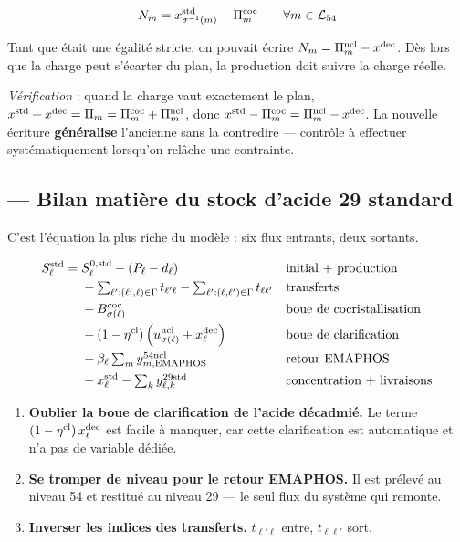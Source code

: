 \begin{equation}
N_m = x^{\mathrm{std}}_{\sigma^{-1}(m)} - \Pi^{\mathrm{coc}}_m \qquad \forall m \in \mathcal{L}_{54}
\label{eq:C6}
\end{equation}

\begin{encadre}[title={Cohérence avec la formulation initiale}]
Tant que  était une égalité stricte, on pouvait écrire $N_m = \Pi^{\mathrm{ncl}}_m - x^{\mathrm{dec}}$. Dès
lors que la charge peut s'écarter du plan, la production doit suivre la charge réelle.

\emph{Vérification} : quand la charge vaut exactement le plan,
$x^{\mathrm{std}} + x^{\mathrm{dec}} = \Pi_m = \Pi^{\mathrm{coc}}_m + \Pi^{\mathrm{ncl}}_m$, donc $x^{\mathrm{std}} - \Pi^{\mathrm{coc}}_m = \Pi^{\mathrm{ncl}}_m - x^{\mathrm{dec}}$.
La nouvelle écriture \textbf{généralise} l'ancienne sans la contredire --- contrôle à
effectuer systématiquement lorsqu'on relâche une contrainte.
\end{encadre}

\subsection{ --- Bilan matière du stock d'acide 29 standard}

C'est l'équation la plus riche du modèle : six flux entrants, deux sortants.

\begin{align}
S^{\mathrm{std}}_\ell = \;& S^{0,\mathrm{std}}_\ell + (P_\ell - d_\ell)
&& \text{initial + production} \notag \\
&+ \textstyle\sum_{\ell' : (\ell',\ell) \in \Gamma} t_{\ell'\ell}
 - \textstyle\sum_{\ell' : (\ell,\ell') \in \Gamma} t_{\ell\ell'}
&& \text{transferts} \notag \\
&+ B^{\mathrm{coc}}_{\sigma(\ell)}
&& \text{boue de cocristallisation} \notag \\
&+ (1-\eta^{\mathrm{cl}})\left(u^{\mathrm{ncl}}_{\sigma(\ell)} + x^{\mathrm{dec}}_\ell\right)
&& \text{boue de clarification} \notag \\
&+ \beta_\ell \textstyle\sum_{m} y^{\text{54ncl}}_{m,\text{EMAPHOS}}
&& \text{retour EMAPHOS} \notag \\
&- x^{\mathrm{std}}_\ell - \textstyle\sum_{k} y^{\text{29std}}_{\ell,k}
&& \text{concentration + livraisons}
\label{eq:C7}
\end{align}

\begin{alerte}[title={Les trois pièges de cette équation}]
\begin{enumerate}
  \item \textbf{Oublier la boue de clarification de l'acide décadmié.} Le terme
        $(1-\eta^{\mathrm{cl}})\,x^{\mathrm{dec}}_\ell$ est facile à manquer, car cette clarification est
        automatique et n'a pas de variable dédiée.
  \item \textbf{Se tromper de niveau pour le retour EMAPHOS.} Il est prélevé au niveau 54 et
        restitué au niveau 29 --- le seul flux du système qui remonte.
  \item \textbf{Inverser les indices des transferts.} $t_{\ell'\ell}$ entre,
        $t_{\ell\ell'}$ sort.
\end{enumerate}
\end{alerte}

